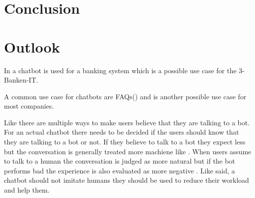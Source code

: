 \section{Conclusion}



\section{Outlook}
In \citet{singhbuilding} a chatbot is used for a banking system which is a possible use case for the 3-Banken-IT.

A common use case for chatbots are FAQs(\citet{evaluateChatbotsShawar2007, buiildChatbotsPython, huang2007extracting, GO2019304}) and is another possible use case for most companies.


Like \citet{GO2019304} there are multiple ways to make users believe that they are talking to a bot.
For an actual chatbot there needs to be decided if the users should know that they are talking to a bot or not.
If they believe to talk to a bot they expect less but the conversation is generally treated more machiene like \cite{GO2019304}.
When users assume to talk to a human the conversation is judged as more natural but if the bot performs bad 
the experience is also evaluated as more negative \cite{GO2019304}.
Like \citet{shawar2007chatbots} said, a chatbot should not imitate humans they should be used to 
reduce their workload and help them.